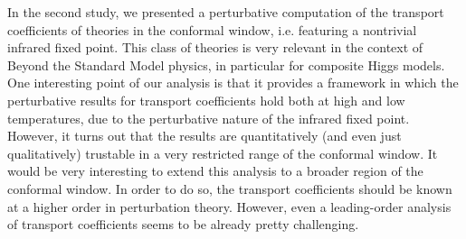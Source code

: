 In the second study, we presented a perturbative computation of the transport coefficients of theories in the conformal window, i.e. featuring a nontrivial infrared fixed point. 
This class of theories is very relevant in the context of Beyond the Standard Model physics, in particular for composite Higgs models. One interesting point of our analysis is that it provides a framework in which the perturbative results for transport coefficients hold both at high and low temperatures, due to the perturbative nature of the infrared fixed point. 
However, it turns out that the results are quantitatively (and even just qualitatively) trustable in a very restricted range of the conformal window. It would be very interesting to extend this analysis to a broader region of the conformal window. In order to do so, the transport coefficients should be known at a higher order in perturbation theory. However, even a leading-order analysis of transport coefficients seems to be already pretty challenging.